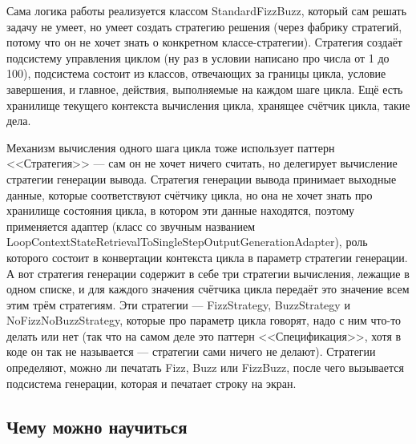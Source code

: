 \documentclass{../text-style}
\begin{document}
Сама логика работы реализуется классом StandardFizzBuzz, который сам решать задачу не умеет, но умеет создать стратегию решения (через фабрику стратегий, потому что он не хочет знать о конкретном классе-стратегии). Стратегия создаёт подсистему управления циклом (ну раз в условии написано про числа от 1 до 100), подсистема состоит из классов, отвечающих за границы цикла, условие завершения, и главное, действия, выполняемые на каждом шаге цикла. Ещё есть хранилище текущего контекста вычисления цикла, хранящее счётчик цикла, такие дела.

Механизм вычисления одного шага цикла тоже использует паттерн <<Стратегия>> --- сам он не хочет ничего считать, но делегирует вычисление стратегии генерации вывода. Стратегия генерации вывода принимает выходные данные, которые соответствуют счётчику цикла, но она не хочет знать про хранилище состояния цикла, в котором эти данные находятся, поэтому применяется адаптер (класс со звучным названием LoopContextStateRetrievalToSingleStepOutputGenerationAdapter), роль которого состоит в конвертации контекста цикла в параметр стратегии генерации. А вот стратегия генерации содержит в себе три стратегии вычисления, лежащие в одном списке, и для каждого значения счётчика цикла передаёт это значение всем этим трём стратегиям. Эти стратегии --- FizzStrategy, BuzzStrategy и NoFizzNoBuzzStrategy, которые про параметр цикла говорят, надо с ним что-то делать или нет (так что на самом деле это паттерн <<Спецификация>>, хотя в коде он так не называется --- стратегии сами ничего не делают). Стратегии определяют, можно ли печатать Fizz, Buzz или FizzBuzz, после чего вызывается подсистема генерации, которая и печатает строку на экран.

\subsection{Чему можно научиться}
\end{document}
